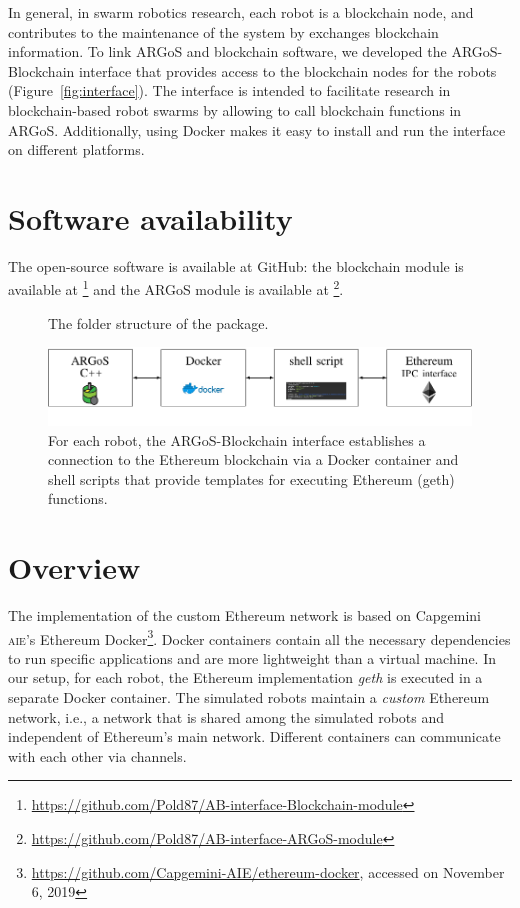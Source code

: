 \documentclass{article}
\begin{document}
In general, in swarm robotics research, each robot is a blockchain
node, and contributes to the maintenance of the system by exchanges
blockchain information. To link ARGoS and blockchain software, we
developed the ARGoS-Blockchain interface that provides access to the
blockchain nodes for the robots (Figure~\ref{fig:interface}). The
interface is intended to facilitate research in blockchain-based robot
swarms by allowing to call blockchain functions in
ARGoS. Additionally, using Docker makes it easy to install and run the
interface on different platforms.


\section{Software availability}

The open-source software is available at GitHub: the blockchain module
is available at
\footnote{\url{https://github.com/Pold87/AB-interface-Blockchain-module}}
and the ARGoS module is available at
\footnote{\url{https://github.com/Pold87/AB-interface-ARGoS-module}}.

\begin{figure}[t]%
{}
\label{fig:folderstructure}  
\caption{The folder structure of the package.}
\end{figure}
\begin{figure}
  \centering
    \includegraphics[width=\textwidth]{overview}
  \caption{For each robot, the ARGoS-Blockchain interface establishes
    a connection to the Ethereum blockchain via a Docker container and
    shell scripts that provide templates for executing Ethereum (geth)
    functions.}
  \label{fig:overview}  
\end{figure}

\section{Overview}

The implementation of the custom Ethereum network is based on
Capgemini \textsc{aie}'s Ethereum
Docker\footnote{\url{https://github.com/Capgemini-AIE/ethereum-docker},
  accessed on November 6, 2019}. Docker containers
\citep{Mer2014:linux} contain all the necessary dependencies to run
specific applications and are more lightweight than a virtual
machine. In our setup, for each robot, the Ethereum implementation
\emph{geth} is executed in a separate Docker container. The simulated
robots maintain a \emph{custom} Ethereum network, i.e., a network that
is shared among the simulated robots and independent of Ethereum's
main network. Different containers can communicate with each other via
channels.
\end{document}

